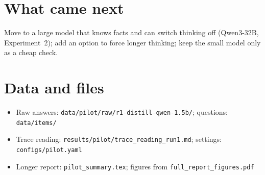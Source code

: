 \documentclass[11pt,a4paper]{article}
\begin{document}
\section{What came next}
Move to a large model that knows facts and can switch thinking off (Qwen3-32B, Experiment~2); add an option to force longer thinking; keep the small model only as a cheap check.

\appendix
\section{Data and files}
\begin{itemize}[leftmargin=*]
  \item Raw answers: \texttt{data/pilot/raw/r1-distill-qwen-1.5b/}; questions: \texttt{data/items/}
  \item Trace reading: \texttt{results/pilot/trace\_reading\_run1.md}; settings: \texttt{configs/pilot.yaml}
  \item Longer report: \texttt{pilot\_summary.tex}; figures from \texttt{full\_report\_figures.pdf}
\end{itemize}



\end{document}
